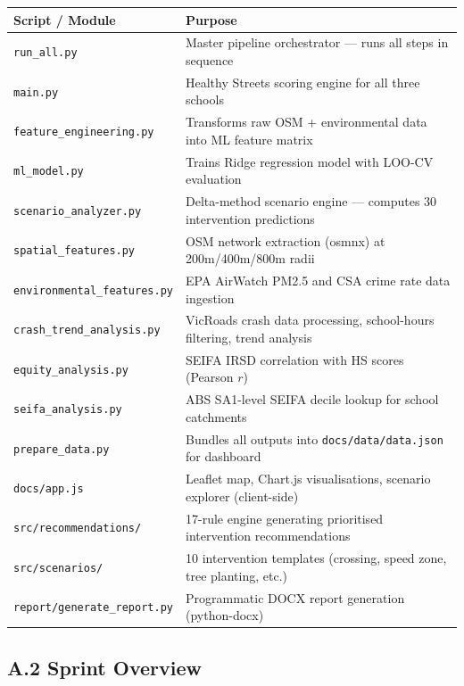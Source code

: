 \documentclass[11pt,a4paper]{article}
\begin{document}
\begin{table}[H]\centering\small
\begin{tabular}{L{4.5cm}L{9.5cm}}
\toprule
\textbf{Script / Module} & \textbf{Purpose} \\
\midrule
\texttt{run\_all.py}               & Master pipeline orchestrator — runs all steps in sequence \\
\texttt{main.py}                   & Healthy Streets scoring engine for all three schools \\
\texttt{feature\_engineering.py}   & Transforms raw OSM + environmental data into ML feature matrix \\
\texttt{ml\_model.py}              & Trains Ridge regression model with LOO-CV evaluation \\
\texttt{scenario\_analyzer.py}     & Delta-method scenario engine — computes 30 intervention predictions \\
\texttt{spatial\_features.py}      & OSM network extraction (osmnx) at 200m/400m/800m radii \\
\texttt{environmental\_features.py}& EPA AirWatch PM2.5 and CSA crime rate data ingestion \\
\texttt{crash\_trend\_analysis.py} & VicRoads crash data processing, school-hours filtering, trend analysis \\
\texttt{equity\_analysis.py}       & SEIFA IRSD correlation with HS scores (Pearson $r$) \\
\texttt{seifa\_analysis.py}        & ABS SA1-level SEIFA decile lookup for school catchments \\
\texttt{prepare\_data.py}          & Bundles all outputs into \texttt{docs/data/data.json} for dashboard \\
\texttt{docs/app.js}               & Leaflet map, Chart.js visualisations, scenario explorer (client-side) \\
\texttt{src/recommendations/}      & 17-rule engine generating prioritised intervention recommendations \\
\texttt{src/scenarios/}            & 10 intervention templates (crossing, speed zone, tree planting, etc.) \\
\texttt{report/generate\_report.py}& Programmatic DOCX report generation (python-docx) \\
\bottomrule
\end{tabular}
\end{table}

\subsection*{A.2 Sprint Overview}
\end{document}
